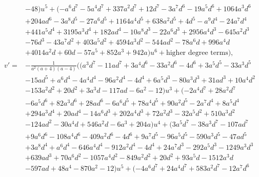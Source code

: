 \documentclass{gtpart}
\theoremstyle{definition}
\theoremstyle{remark}
\begin{document}
\begin{equation*}
\begin{split}
      & - 48) u^5 + (-a^6 d^7 - 5 a^4 d^7 + 337 a^2 d^7 + 12 d^7 - 3 a^7 d^6 - 19 a^5 d^6 + 1064 a^3 d^6 \\
      & + 204 a d^6 - 3 a^8 d^5 - 27 a^6 d^5 + 1164 a^4 d^5 + 638 a^2 d^5 + 4 d^5 - a^9 d^4 - 24 a^7 d^4 \\
      & + 441 a^5 d^4 + 3195 a^3 d^4 + 182 a d^4 - 10 a^8 d^3 - 22 a^6 d^3 + 2956 a^4 d^3 - 645 a^2 d^3 \\
      & - 76 d^3 - 43 a^7 d^2 + 403 a^5 d^2 + 4594 a^3 d^2 - 544 a d^2 - 78 a^6 d + 996 a^4 d \\
      & + 4014 a^2 d + 60 d - 57 a^5 + 852 a^3 + 942 a) u^6 + \text{higher degree terms} \big), \\
 v' = & -\frac{1}{a^2 (a + 4) (a - 4)} \big( (a^3 d^7 - 11 a d^7 + 3 a^4 d^6 - 33 a^2 d^6 - 4 d^6 + 3 a^5 d^5 - 33 a^3 d^5 \\
      & - 15 a d^5 + a^6 d^4 - 4 a^4 d^4 - 96 a^2 d^4 - 4 d^4 + 6 a^5 d^3 - 80 a^3 d^3 + 31 a d^3 + 10 a^4 d^2 \\
      & - 153 a^2 d^2 + 20 d^2 + 3 a^3 d - 117 a d - 6 a^2 - 12) u^3 + (-2 a^4 d^7 + 28 a^2 d^7 \\
      & - 6 a^5 d^6 + 82 a^3 d^6 + 28 a d^6 - 6 a^6 d^5 + 78 a^4 d^5 + 90 a^2 d^5 - 2 a^7 d^4 + 8 a^5 d^4 \\
      & + 294 a^3 d^4 + 20 a d^4 - 14 a^6 d^3 + 202 a^4 d^3 + 72 a^2 d^3 - 32 a^5 d^2 + 510 a^3 d^2 \\
      & - 124 a d^2 - 30 a^4 d + 546 a^2 d - 6 a^3 + 204 a) u^4 + (3 a^5 d^7 - 38 a^3 d^7 - 107 a d^7 \\
      & + 9 a^6 d^6 - 108 a^4 d^6 - 409 a^2 d^6 - 4 d^6 + 9 a^7 d^5 - 96 a^5 d^5 - 590 a^3 d^5 - 47 a d^5 \\
      & + 3 a^8 d^4 + a^6 d^4 - 646 a^4 d^4 - 912 a^2 d^4 - 4 d^4 + 24 a^7 d^3 - 292 a^5 d^3 - 1249 a^3 d^3 \\
      & + 639 a d^3 + 70 a^6 d^2 - 1057 a^4 d^2 - 849 a^2 d^2 + 20 d^2 + 93 a^5 d - 1512 a^3 d \\
      & - 597 a d + 48 a^4 - 870 a^2 - 12) u^5 + (-4 a^6 d^7 + 24 a^4 d^7 + 583 a^2 d^7 - 12 a^7 d^6 
\end{split}
\end{equation*}
\end{document}
